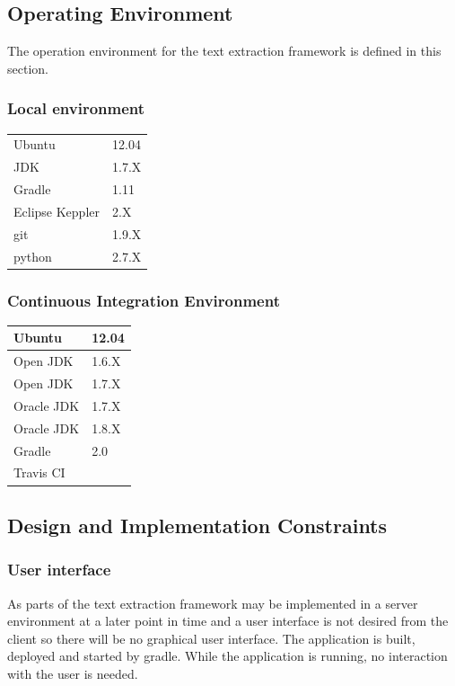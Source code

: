 \subsection{Operating Environment}

The operation environment for the text extraction framework is defined in this section.

\subsubsection{Local environment}

\begin{tabular}{| p{3cm} | p{3cm} |}
	\hline
	Ubuntu & 12.04 \\
	JDK & 1.7.X  \\ \hline
	Gradle & 1.11 \\ \hline
	Eclipse Keppler & 2.X \\ \hline
	git & 1.9.X \\ \hline
	python & 2.7.X \\ \hline

\end{tabular}


\subsubsection{Continuous Integration Environment}

\begin{tabular}{| p{3cm} | p{3cm} |}
	\hline
	Ubuntu & 12.04 \\ \hline
	Open JDK & 1.6.X  \\ \hline
	Open JDK & 1.7.X  \\ \hline
	Oracle JDK & 1.7.X \\ \hline
	Oracle JDK & 1.8.X  \\ \hline
	Gradle & 2.0 \\ \hline
	Travis CI &  \\ \hline
\end{tabular}



\subsection{Design and Implementation Constraints}

\subsubsection{User interface}
As parts of the text extraction framework may be implemented in a server environment at a later point in time and a user interface is not desired from the client so there will be no graphical user interface. The application is built, deployed and started by gradle. While the application is running, no interaction with the user is needed.


